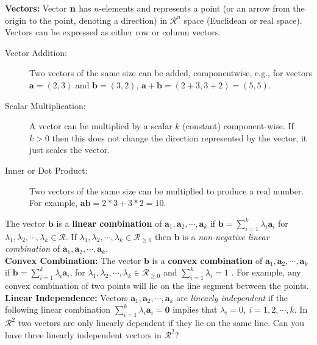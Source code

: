 {\bf Vectors:} Vector $\bf n$ has ${n}$-elements and represents a point (or an arrow from the origin to the point, denoting a direction) in $\mathcal{R}^n$ space (Euclidean or real space). Vectors can be expressed as either row or column vectors. \vspace{-2mm}
\begin{description}
\item[Vector Addition:] Two vectors of the same size can be added, componentwise, e.g., for vectors
$\mathbf{a}=(2,3)$ and $\mathbf{b} = (3,2)$,  $\mathbf{a} + \mathbf{b} = (2+3,3+2) = (5,5)$. \vspace{-2mm}
\item[Scalar Multiplication:] A vector can be multiplied by a scalar $k$ (constant) component-wise. If $k > 0$ then this does not change the direction represented by the vector, it just scales the vector. \vspace{-2mm}
\item[Inner or Dot Product:] Two vectors of the same size can be multiplied to produce a real number.  For example, $\mathbf{a}\mathbf{b} = 2*3 + 3*2 = 10$.
\end{description} 

  The vector ${\mathbf b}$ is a {\bf linear combination} of ${\mathbf a_1}, {\mathbf a_2}, \cdots, {\mathbf a_k}$ if ${\mathbf b} = \sum_{i=1}^k \lambda_i {\mathbf a_i}$ for $\lambda_1, \lambda_2,\cdots, \lambda_k \in \mathcal{R}$. If $\lambda_1, \lambda_2,\cdots,\lambda_k \in \mathcal{R}_{\ge 0}$ then ${\mathbf b}$ is a {\it non-negative linear combination} of ${\mathbf a_1},{\mathbf a_2},\cdots,{\mathbf a_k}$. \\

{\bf Convex Combination:}  The vector ${\mathbf b}$ is a {\bf convex combination} of ${\mathbf a_1},{\mathbf a_2},\cdots,{\mathbf a_k}$ if ${\mathbf b} = \sum_{i=1}^k \lambda_i {\mathbf a_i}$, for $\lambda_1, \lambda_2,\cdots,\lambda_k \in \mathcal{R}_{\ge 0}$ and $\sum_{i=1}^k \lambda_i = 1$ . For example, any convex combination of two points will lie on the line segment between the points. \\

{\bf Linear Independence:}  Vectors ${\mathbf a_1},{\mathbf a_2},\cdots,{\mathbf a_k}$ are {\it linearly independent} if the following linear combination $\sum_{i=1}^k \lambda_i {\mathbf a_i} = {\mathbf 0}$ implies that $\lambda_i = 0,~ i = 1,2,\cdots,k$. In $\mathcal{R}^2$ two vectors are only linearly dependent if they lie on the same line. Can you have three linearly independent vectors in $\mathcal{R}^2$? \\

